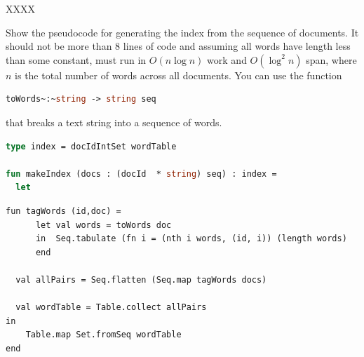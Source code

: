 \begin{problem}%
XXXX

\ask
Show the pseudocode for generating the index from the sequence of documents.
It should not be more than 8 lines of code and assuming all words have
length less than some constant, must run in $O(n \log n)$ work and
$O(\log^2 n)$ span, where $n$ is the total number of words across all
documents.    
%
You can use the function
%
\begin{lstlisting}[language=ocaml,numbers=none]
toWords~:~string -> string seq
\end{lstlisting}
%
that breaks a text string into a sequence of words.

\begin{lstlisting}[language=ocaml, numbers=none]
type index = docIdIntSet wordTable

fun makeIndex (docs : (docId  * string) seq) : index =
  let


\end{lstlisting}

\sol

\begin{lstlisting}[numbers=none]
  fun tagWords (id,doc) = 
      let val words = toWords doc
      in  Seq.tabulate (fn i = (nth i words, (id, i)) (length words) 
      end

  val allPairs = Seq.flatten (Seq.map tagWords docs)

  val wordTable = Table.collect allPairs
in
    Table.map Set.fromSeq wordTable
end
\end{lstlisting}
\end{problem}

